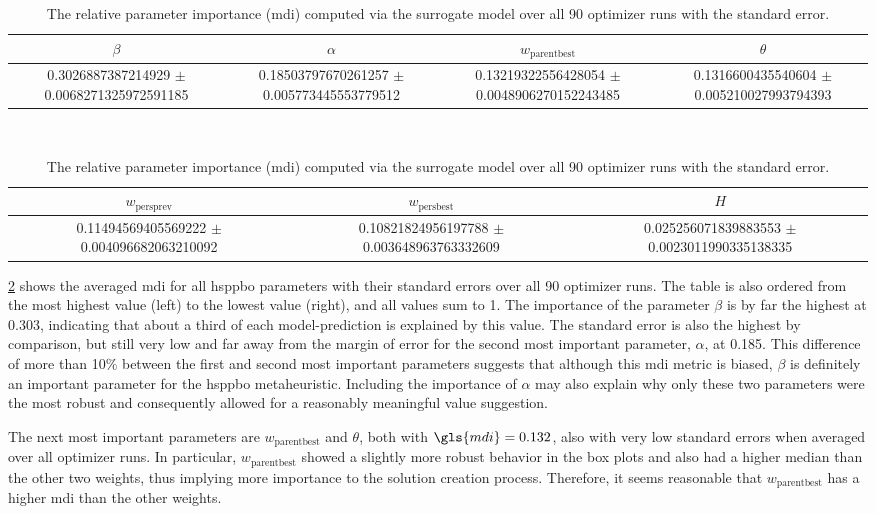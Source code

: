 \begin{table}[h]
	\centering
	\caption[Relative parameter importance over all 90 optimizer runs]{The relative parameter importance (\gls{mdi}) computed via the surrogate model over all 90 optimizer runs with the standard error. }
	\label{tab:parameter_importance}
	\begin{tabular}{cccc}
		\hline
		$\beta$ & $\alpha$ & $w_{\text{parentbest}}$ & $\theta$ \\ \hline
		  \num{0.3026887387214929} $\pm$ \num{0.0068271325972591185} & 
		  \num{0.18503797670261257} $\pm$ \num{0.005773445553779512} & 
		  \num{0.13219322556428054} $\pm$ \num{0.0048906270152243485} & 
		  \num{0.1316600435540604} $\pm$ \num{0.005210027993794393} \\ \hline
	\end{tabular}
	\bigskip\\
	\begin{tabular}{ccc}
		\hline
		$w_{\text{persprev}}$ & $w_{\text{persbest}}$ & $H$ \\ \hline
		\num{0.11494569405569222} $\pm$ \num{0.004096682063210092} & 
		\num{0.10821824956197788} $\pm$ \num{0.003648963763332609} & 
		\num{0.025256071839883553} $\pm$ \num{0.0023011990335138335} \\ \hline
	\end{tabular}
\end{table}


\cref{tab:parameter_importance} shows the averaged \gls{mdi} for all \gls{hsppbo} parameters with their standard errors over all 90 optimizer runs. The table is also ordered from the most highest value (left) to the lowest value (right), and all values sum to 1. The importance of the parameter $\beta$ is by far the highest at 0.303, indicating that about a third of each model-prediction is explained by this value. The standard error is also the highest by comparison, but still very low and far away from the margin of error for the second most important parameter, $\alpha$, at 0.185. This difference of more than 10\% between the first and second most important parameters suggests that although this \gls{mdi} metric is biased, $\beta$ is definitely an important parameter for the \gls{hsppbo} metaheuristic. Including the importance of $\alpha$ may also explain why only these two parameters were the most robust and consequently allowed for a reasonably meaningful value suggestion.

The next most important parameters are $w_{\text{parentbest}}$ and $\theta$, both with $\gls{mdi} = 0.132$, also with very low standard errors when averaged over all optimizer runs. In particular, $w_{\text{parentbest}}$ showed a slightly more robust behavior in the box plots and also had a higher median than the other two weights, thus implying more importance to the solution creation process. Therefore, it seems reasonable that $w_{\text{parentbest}}$ has a higher \gls{mdi} than the other weights.

